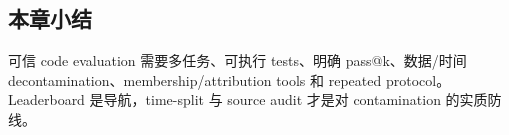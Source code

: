 
\subsection{本章小结}

可信 code evaluation 需要多任务、可执行 tests、明确 pass@k、数据/时间 decontamination、membership/attribution tools 和 repeated protocol。Leaderboard 是导航，time-split 与 source audit 才是对 contamination 的实质防线。


